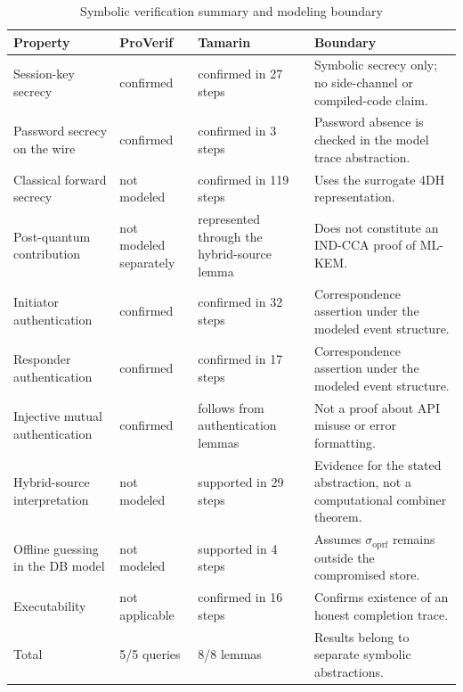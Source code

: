 \documentclass[preprint,12pt]{elsarticle}
\newcommand{\sigoprf}{\sigma_{\mathrm{oprf}}}
\theoremstyle{remark}
\begin{document}
\begin{table}[htbp]
\caption{Symbolic verification summary and modeling boundary}
\label{tab:verification-summary}
\centering\scriptsize
\begin{tabularx}{\textwidth}{@{}L{3.4cm}L{2.4cm}L{3.3cm}X@{}}
\toprule
Property & ProVerif & Tamarin & Boundary \\
\midrule
Session-key secrecy & confirmed & confirmed in 27 steps & Symbolic secrecy only; no side-channel or compiled-code claim. \\
Password secrecy on the wire & confirmed & confirmed in 3 steps & Password absence is checked in the model trace abstraction. \\
Classical forward secrecy & not modeled & confirmed in 119 steps & Uses the surrogate 4DH representation. \\
Post-quantum contribution & not modeled separately & represented through the hybrid-source lemma & Does not constitute an IND-CCA proof of ML-KEM. \\
Initiator authentication & confirmed & confirmed in 32 steps & Correspondence assertion under the modeled event structure. \\
Responder authentication & confirmed & confirmed in 17 steps & Correspondence assertion under the modeled event structure. \\
Injective mutual authentication & confirmed & follows from authentication lemmas & Not a proof about API misuse or error formatting. \\
Hybrid-source interpretation & not modeled & supported in 29 steps & Evidence for the stated abstraction, not a computational combiner theorem. \\
Offline guessing in the DB model & not modeled & supported in 4 steps & Assumes $\sigoprf$ remains outside the compromised store. \\
Executability & not applicable & confirmed in 16 steps & Confirms existence of an honest completion trace. \\
\midrule
Total & 5/5 queries & 8/8 lemmas & Results belong to separate symbolic abstractions. \\
\bottomrule
\end{tabularx}
\end{table}
\end{document}
